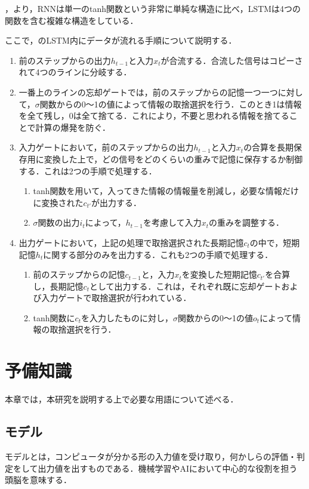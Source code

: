 \documentclass{eithesis}
\begin{document}
		，より，RNNは単一のtanh関数という非常に単純な構造に比べ，LSTMは4つの関数を含む複雑な構造をしている．
		
		ここで，のLSTM内にデータが流れる手順について説明する．
		\begin{enumerate}
			\item 前のステップからの出力$h_{t-1}$と入力$x_t$が合流する．合流した信号はコピーされて4つのラインに分岐する．
			\item 一番上のラインの忘却ゲートでは，前のステップからの記憶一つ一つに対して，$\sigma$関数からの0〜1の値によって情報の取捨選択を行う．このとき1は情報を全て残し，0は全て捨てる．これにより，不要と思われる情報を捨てることで計算の爆発を防ぐ．
			\item 入力ゲートにおいて，前のステップからの出力$h_{t-1}$と入力$x_t$の合算を長期保存用に変換した上で，どの信号をどのくらいの重みで記憶に保存するか制御する．これは2つの手順で処理する．
				\begin{enumerate}
					\item tanh関数を用いて，入ってきた情報の情報量を削減し，必要な情報だけに変換された$c_{t'}$が出力する．
					\item $\sigma$関数の出力$i_t$によって，$h_{t-1}$を考慮して入力$x_t$の重みを調整する．
				\end{enumerate}
			\item 出力ゲートにおいて，上記の処理で取捨選択された長期記憶$c_t$の中で，短期記憶$h_t$に関する部分のみを出力する．これも2つの手順で処理する．
				\begin{enumerate}
					\item 前のステップからの記憶$c_{t-1}$と，入力$x_t$を変換した短期記憶$c_{t'}$を合算し，長期記憶$c_t$として出力する．これは，それぞれ既に忘却ゲートおよび入力ゲートで取捨選択が行われている．
					\item tanh関数に$c_t$を入力したものに対し，$\sigma$関数からの0〜1の値$o_t$によって情報の取捨選択を行う．
				\end{enumerate}
		\end{enumerate}

\chapter{予備知識}
	本章では，本研究を説明する上で必要な用語について述べる．

	\section{モデル}
		モデルとは，コンピュータが分かる形の入力値を受け取り，何かしらの評価・判定をして出力値を出すものである．機械学習やAIにおいて中心的な役割を担う頭脳を意味する．
\end{document}
